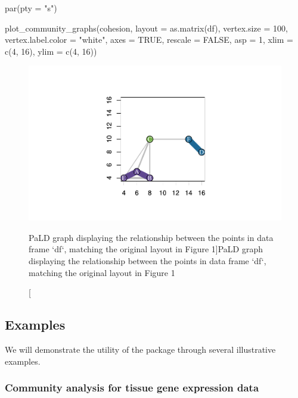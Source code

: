 \begin{Schunk}
\begin{Sinput}
par(pty = "s")

plot_community_graphs(cohesion,
                      layout = as.matrix(df),
                      vertex.size = 100,
                      vertex.label.color = "white",
                      axes = TRUE,
                      rescale = FALSE,
                      asp = 1,
                      xlim = c(4, 16),
                      ylim = c(4, 16))
\end{Sinput}
\begin{figure}[H]
\includegraphics[width=5in,trim=0in 0.6in 0in 0.8in,clip]{dagostino-mcgowan_files/figure-latex/fig3-1} \caption[PaLD graph displaying the relationship between the points in data frame `df`, matching the original layout in Figure 1]{PaLD graph displaying the relationship between the points in data frame `df`, matching the original layout in Figure 1}\label{fig:fig3}
\end{figure}
\end{Schunk}

\hypertarget{examples}{%
\subsection{Examples}\label{examples}}

We will demonstrate the utility of the  package through
several illustrative examples.

\hypertarget{community-analysis-for-tissue-gene-expression-data}{%
\subsubsection{Community analysis for tissue gene expression
data}\label{community-analysis-for-tissue-gene-expression-data}}

